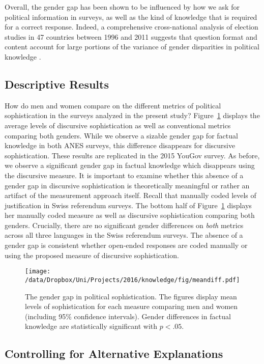 Overall, the gender gap has been shown to be influenced by how we ask for political information in surveys, as well as the kind of knowledge that is required for a correct response. Indeed, a comprehensive cross-national analysis of election studies in 47 countries between 1996 and 2011 suggests that question format and content account for large portions of the variance of gender disparities in political knowledge \citep{fortin2016cross}.


\subsection{Descriptive Results}
How do men and women compare on the different metrics of political sophistication in the surveys analyzed in the present study? Figure~\ref{fig:meandiff} displays the average levels of discursive sophistication as well as conventional metrics comparing both genders. While we observe a sizable gender gap for factual knowledge in both ANES surveys, this difference disappears for discursive sophistication. These results are replicated in the 2015 YouGov survey. As before, we observe a significant gender gap in factual knowledge which disappears using the discursive measure. It is important to examine whether this absence of a gender gap in discursive sophistication is theoretically meaningful or rather an artifact of the measurement approach itself. Recall that \citet{colombo2016justifications} manually coded levels of justification in Swiss referendum surveys. The bottom half of Figure~\ref{fig:meandiff} displays her manually coded measure as well as discursive sophistication comparing both genders. Crucially, there are no significant gender differences on \textit{both} metrics across all three languages in the Swiss referendum surveys. The absence of a gender gap is consistent whether open-ended responses are coded manually or using the proposed measure of discursive sophistication.

\begin{figure}[h]\centering
\texttt{[image: /data/Dropbox/Uni/Projects/2016/knowledge/fig/meandiff.pdf]}
\caption{The gender gap in political sophistication. The figures display mean levels of sophistication for each measure comparing men and women (including 95\% confidence intervals). Gender differences in factual knowledge are statistically significant with $p<.05$.}\label{fig:meandiff}
\end{figure}


\subsection{Controlling for Alternative Explanations}


